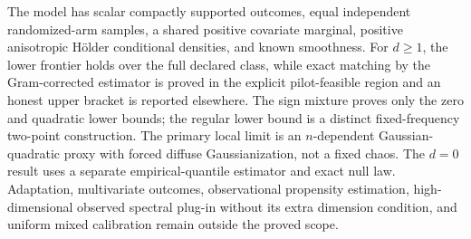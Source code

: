The model has scalar compactly supported outcomes, equal independent randomized-arm samples, a shared positive covariate marginal, positive anisotropic H\"older conditional densities, and known smoothness. For \(d\ge1\), the lower frontier holds over the full declared class, while exact matching by the Gram-corrected estimator is proved in the explicit pilot-feasible region and an honest upper bracket is reported elsewhere. The sign mixture proves only the zero and quadratic lower bounds; the regular lower bound is a distinct fixed-frequency two-point construction. The primary local limit is an \(n\)-dependent Gaussian-quadratic proxy with forced diffuse Gaussianization, not a fixed chaos. The \(d=0\) result uses a separate empirical-quantile estimator and exact null law. Adaptation, multivariate outcomes, observational propensity estimation, high-dimensional observed spectral plug-in without its extra dimension condition, and uniform mixed calibration remain outside the proved scope.